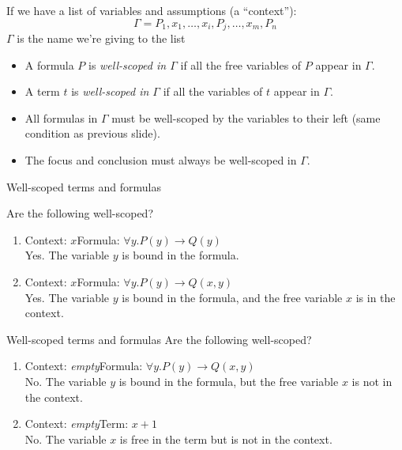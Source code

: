 \documentclass[xetex,aspectratio=169,14pt,hyperref={pdfpagelabels=true,pdflang={en-GB}}]{beamer}
\begin{document}
\begin{frame}[t]

  If we have a list of variables and assumptions (a ``context''):
  \begin{displaymath}
    \Gamma = P_1, x_1, \dots, x_i, P_j, \dots, x_m, P_n
  \end{displaymath}
  \textcolor{black!60}{$\Gamma$ is the name we're giving to the list}

  \bigskip

  \begin{itemize}
  \item A formula $P$ is \emph{well-scoped in $\Gamma$} if all the
    free variables of $P$ appear in $\Gamma$.
  \item A term $t$ is \emph{well-scoped in $\Gamma$} if all the
    variables of $t$ appear in $\Gamma$.
  \end{itemize}

  \bigskip

  \begin{itemize}
  \item All formulas in $\Gamma$ must be well-scoped by the variables
    to their left (same condition as previous slide).
  \item The focus and conclusion must always be well-scoped in
    $\Gamma$.
  \end{itemize}
\end{frame}

\begin{frame}
  {Well-scoped terms and formulas}

  Are the following well-scoped?

  \bigskip

  \begin{enumerate}
  \item Context: $x$\quad Formula: $\forall y. P(y) \to Q(y)$\\
    \pause
    Yes. The variable $y$ is bound in the formula.
    \pause
  \item Context: $x$\quad Formula: $\forall y. P(y) \to Q(x,y)$\\
    \pause Yes. The variable $y$ is bound in the formula, and the free
    variable $x$ is in the context.
  \end{enumerate}
\end{frame}

\begin{frame}
  {Well-scoped terms and formulas}
  Are the following well-scoped?

  \bigskip

  \begin{enumerate}
  \item Context: \emph{empty}\quad Formula: $\forall y. P(y) \to Q(x,y)$\\
    \pause No. The variable $y$ is bound in the formula, but the free
    variable $x$ is not in the context.
    \pause
  \item Context: \emph{empty}\quad Term: $x+1$\\
    \pause No. The variable $x$ is free in the term but is not in the
    context.  \pause
  \end{enumerate}
\end{frame}
\end{document}

